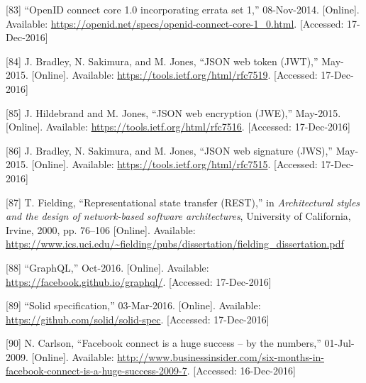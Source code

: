 \documentclass[12pt,english,a4paper,titlepage,cleardoublepage=empty,dottedtoc]{report}
\begin{document}
\hypertarget{ref-web_spec_openid-connect-1}{}
{[}83{]} ``OpenID connect core 1.0 incorporating errata set 1,''
08-Nov-2014. {[}Online{]}. Available:
\url{https://openid.net/specs/openid-connect-core-1_0.html}.
{[}Accessed: 17-Dec-2016{]}

\hypertarget{ref-web_spec_json-web-token}{}
{[}84{]} J. Bradley, N. Sakimura, and M. Jones, ``JSON web token
(JWT),'' May-2015. {[}Online{]}. Available:
\url{https://tools.ietf.org/html/rfc7519}. {[}Accessed: 17-Dec-2016{]}

\hypertarget{ref-web_spec_json-web-encryption}{}
{[}85{]} J. Hildebrand and M. Jones, ``JSON web encryption (JWE),''
May-2015. {[}Online{]}. Available:
\url{https://tools.ietf.org/html/rfc7516}. {[}Accessed: 17-Dec-2016{]}

\hypertarget{ref-web_spec_json-web-signature}{}
{[}86{]} J. Bradley, N. Sakimura, and M. Jones, ``JSON web signature
(JWS),'' May-2015. {[}Online{]}. Available:
\url{https://tools.ietf.org/html/rfc7515}. {[}Accessed: 17-Dec-2016{]}

\hypertarget{ref-web_spec_rest}{}
{[}87{]} T. Fielding, ``Representational state transfer (REST),'' in
\emph{Architectural styles and the design of network-based software
architectures}, University of California, Irvine, 2000, pp. 76--106
{[}Online{]}. Available:
\url{https://www.ics.uci.edu/~fielding/pubs/dissertation/fielding_dissertation.pdf}

\hypertarget{ref-web_spec_graphql}{}
{[}88{]} ``GraphQL,'' Oct-2016. {[}Online{]}. Available:
\url{https://facebook.github.io/graphql/}. {[}Accessed: 17-Dec-2016{]}

\hypertarget{ref-web_spec_solid}{}
{[}89{]} ``Solid specification,'' 03-Mar-2016. {[}Online{]}. Available:
\url{https://github.com/solid/solid-spec}. {[}Accessed: 17-Dec-2016{]}

\hypertarget{ref-web_2009-success-of-facebook-connect}{}
{[}90{]} N. Carlson, ``Facebook connect is a huge success -- by the
numbers,'' 01-Jul-2009. {[}Online{]}. Available:
\url{http://www.businessinsider.com/six-months-in-facebook-connect-is-a-huge-success-2009-7}.
{[}Accessed: 16-Dec-2016{]}
\end{document}

